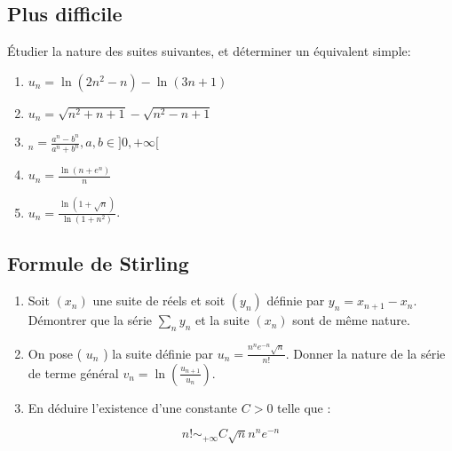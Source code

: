   \vspace{1em}


  \subsection{Plus difficile}
  Étudier la nature des suites suivantes, et déterminer un équivalent simple:
  \begin{multicols}{2}
  \begin{enumerate}[label = \alph*)]
    \item $u_n=\ln \left(2 n^2-n\right)-\ln (3 n+1)$
    \item $u_n=\sqrt{n^2+n+1}-\sqrt{n^2-n+1}$
    \item $_n=\frac{a^n-b^n}{a^n+b^n}, a, b \in] 0,+\infty[$
    \item $u_n=\frac{\ln \left(n+e^n\right)}{n}$
    \item $u_n=\frac{\ln (1+\sqrt{n})}{\ln \left(1+n^2\right)}$.
  \end{enumerate}
  \end{multicols}

  \vspace{1em}

  \subsection{Formule de Stirling}
  \begin{enumerate}[label = \alph*)]
    \item Soit $\left(x_n\right)$ une suite de réels et soit $\left(y_n\right)$ définie par $y_n=x_{n+1}-x_n$. Démontrer que la série $\sum_n y_n$ et la suite $\left(x_n\right)$ sont de même nature.
    \item On pose ( $u_n$ ) la suite définie par $u_n=\frac{n^n e^{-n} \sqrt{n}}{n!}$. Donner la nature de la série de terme général $v_n=\ln \left(\frac{u_{n+1}}{u_n}\right)$.
    \item En déduire l'existence d'une constante $C>0$ telle que :
  \end{enumerate}
  $$
  n!\sim_{+\infty} C \sqrt{n} n^n e^{-n}
  $$

  \vspace{1em}


